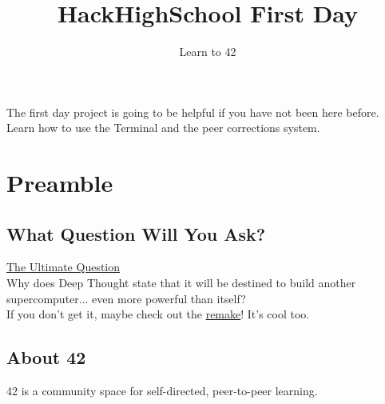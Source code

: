 \documentclass{42-en}
\begin{document}
\title{HackHighSchool First Day}
\subtitle{Learn to 42}


\summary
{
The first day project is going to be helpful if you have not been here before.
Learn how to use the Terminal and the peer corrections system.
}

\maketitle

\tableofcontents



\chapter{Preamble}

\section{What Question Will You Ask?}
\href{https://www.youtube.com/watch?v=x2rS-ha8DbE}{The Ultimate Question}\\

Why does Deep Thought state that it will be destined to build another supercomputer... even more powerful than itself?\\

If you don't get it, maybe check out the \href{https://www.youtube.com/watch?v=aboZctrHfK8}{remake}! It's cool too.

\newpage 

\section{About 42}

42 is a community space for self-directed, peer-to-peer learning.
\end{document}
